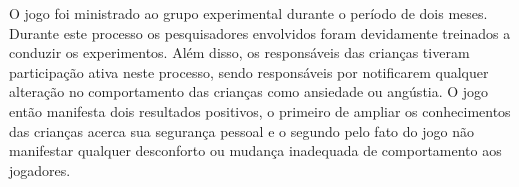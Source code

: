 O jogo foi ministrado ao grupo experimental durante o período de dois meses. %
Durante este processo os pesquisadores envolvidos foram devidamente treinados a conduzir os experimentos. Além disso, os responsáveis das crianças tiveram participação ativa neste processo, sendo responsáveis por notificarem qualquer alteração no comportamento das crianças como ansiedade ou angústia. O jogo então manifesta dois resultados positivos, o primeiro de ampliar os conhecimentos das crianças acerca sua segurança pessoal e o segundo pelo fato do jogo não manifestar qualquer desconforto ou mudança inadequada de comportamento aos jogadores. 










